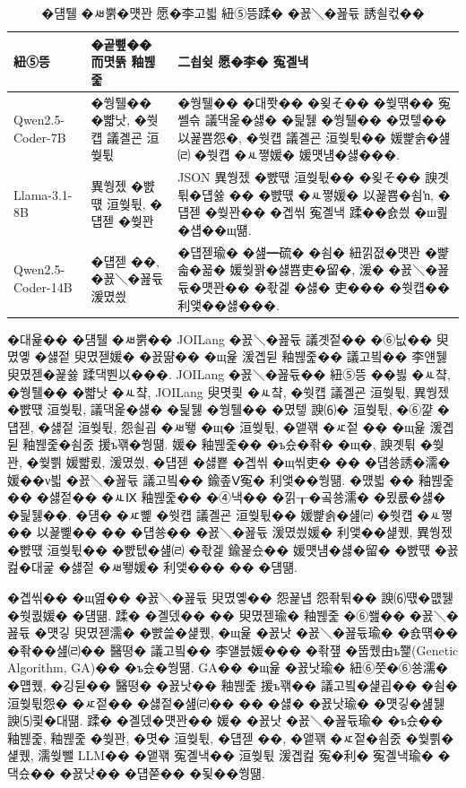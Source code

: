 \documentclass[10pt,twocolumn]{article}
\begin{document}
\begin{table}[t]
\centering
\caption{�덈퉬 �ㅽ뿕�먯꽌 愿�李고븳 紐⑤뜽蹂� �꾨＼�꾪듃 誘쇨컧��}
\label{tab:pilot_prompt_sensitivity}
\footnotesize
\renewcommand{\arraystretch}{1.12}
\begin{tabularx}{\columnwidth}{@{}p{}p{}X@{}}
\toprule
\textbf{紐⑤뜽} & \textbf{�곹뼢�� 而몃뜕 釉붾줉} & \textbf{二쇱슂 愿�李� 寃곌낵} \\
\midrule
Qwen2.5-Coder-7B & �쒕퉬�� �뺣낫, �쒓컙 議곌굔 洹쒖튃 & �쒕퉬�� �대쫫�� �욎そ�� �쒖떆�� 寃쎌슦 議댁옱�섏� �딅뒗 �쒕퉬�� �몄텧�� 以꾩뿀怨�, �쒓컙 議곌굔 洹쒖튃�� 媛뺥솕�섎㈃ �쒓컙 �ㅻ쪟媛� 媛먯냼�섏���. \\
Llama-3.1-8B & 異쒕젰 �뺤떇 洹쒖튃, �덉젣 �쒖꽌 & JSON 異쒕젰 �뺤떇 洹쒖튃�� �욎そ�� 諛곗튂�덉쓣 �� �뺤떇 �ㅻ쪟媛� 以꾩뿀�쇰ŉ, �덉젣 �쒖꽌�� �곕씪 寃곌낵 蹂��숈씠 �ш쾶 �섑��щ떎. \\
Qwen2.5-Coder-14B & �덉젣 ��, �꾨＼�꾪듃 湲몄씠 & �덉젣瑜� �섎━硫� �쇰� 紐낅졊�먯꽌 �뺥솗�꾧� 媛쒖꽑�섏뿀吏�留�, 湲� �꾨＼�꾪듃�먯꽌�� �좏겙 �섏� 吏��� �쒓컙�� 利앷��섏���. \\
\bottomrule
\end{tabularx}
\end{table}

�대윭�� �덈퉬 �ㅽ뿕�� JOILang �꾨＼�꾪듃 議곗젙�� �⑥닚�� 臾몄옣 �섏젙 臾몄젣媛� �꾨땲�� �щ윭 湲곕뒫 釉붾줉�� 議고빀�� 李얜뒗 臾몄젣�꾩쓣 蹂댁뿬以���. JOILang �꾨＼�꾪듃�� 紐⑤뜽 ��븷 �ㅻ챸, �쒕퉬�� �뺣낫 �ㅻ챸, JOILang 臾몃쾿 �ㅻ챸, �쒓컙 議곌굔 洹쒖튃, 異쒕젰 �뺤떇 洹쒖튃, 議댁옱�섏� �딅뒗 �쒕퉬�� �몄텧 諛⑹� 洹쒖튃, �⑥꺑 �덉젣, �섏젙 洹쒖튃, 怨쇨굅 �ㅽ뙣 �щ� 洹쒖튃, �앹꽦 �ㅼ젙 �� �щ윭 湲곕뒫 釉붾줉�쇰줈 援ъ꽦�쒕떎. 媛� 釉붾줉�� �ъ슜�좎� �щ�, 諛곗튂 �쒖꽌, �쒗쁽 媛뺣룄, 湲몄씠, �덉젣 �섏뿉 �곕씪 �щ씪吏� �� �덉쑝誘�濡� 媛��ν븳 �꾨＼�꾪듃 議고빀�� 鍮좊Ⅴ寃� 利앷��쒕떎. �먰븳 �� 釉붾줉�� �섏젙�� �ㅻⅨ 釉붾줉�� �④낵�� �낅┰�곸쑝濡� �묐룞�섏� �딅뒗��. �덈� �ㅼ뼱 �쒓컙 議곌굔 洹쒖튃�� 媛뺥솕�섎㈃ �쒓컙 �ㅻ쪟�� 以꾩뼱�� �� �덉쑝�� �꾨＼�꾪듃 湲몄씠媛� 利앷��섍퀬, 異쒕젰 �뺤떇 洹쒖튃�� �뺤텞�섎㈃ �좏겙 鍮꾩슜�� 媛먯냼�섏�留� �뺤떇 �꾨컲�대굹 �섏젙 �ㅽ뙣媛� 利앷��� �� �덈떎.

�곕씪�� �щ엺�� �꾨＼�꾪듃 臾몄옣�� 怨꾩냽 怨좎튂�� 諛⑹떇�먮뒗 �쒓퀎媛� �덈떎. 蹂� �곌뎄�� �� 臾몄젣瑜� 釉붾줉 �⑥쐞�� �꾨＼�꾪듃 �먯깋 臾몄젣濡� �뺤쓽�섍퀬, �щ윭 �꾨낫 �꾨＼�꾪듃瑜� �숈떆�� �좎��섎㈃�� 醫뗭� 議고빀�� 李얠븘媛��� �좎쟾 �뚭퀬由ъ쬁(Genetic Algorithm, GA)�� �ъ슜�쒕떎. GA�� �щ윭 �꾨낫瑜� 紐⑥쭛�⑥쑝濡� �먭퀬, �깅뒫�� 醫뗭� �꾨낫�� 釉붾줉 援ъ꽦�� 議고빀�섍굅�� �쇰� 洹쒖튃怨� �ㅼ젙�� �섏젙�섎㈃�� �� �섏� �꾨낫瑜� �먯깋�섎뒗 諛⑸쾿�대떎. 蹂� �곌뎄�먯꽌�� 媛� �꾨낫 �꾨＼�꾪듃瑜� �ъ슜�� 釉붾줉, 釉붾줉 �쒖꽌, �몃� 洹쒖튃, �덉젣 ��, �앹꽦 �ㅼ젙�쇰줈 �쒗쁽�섍퀬, 濡쒖뺄 LLM�� �앹꽦 寃곌낵�� 洹쒖튃 湲곕컲 寃�利� 寃곌낵瑜� �댁슜�� �꾨낫�� �덉쭏�� �됯��쒕떎.
\end{document}
